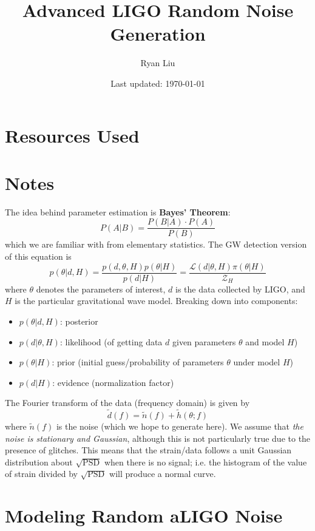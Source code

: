 \documentclass{article}
\title{Advanced LIGO Random Noise Generation}
\author{Ryan Liu}
\date{Last updated: \today}
\newcommand{\lag}{\mathcal{L}}
\begin{document}
\maketitle

\section{Resources Used}



\section{Notes}

The idea behind parameter estimation is \textbf{Bayes' Theorem}:
\begin{equation}
    P (A | B) = \frac{P (B | A) \cdot P (A)}{P(B)}
\end{equation}
which we are familiar with from elementary statistics. The GW detection version of this equation is 
\begin{equation}
    p(\theta | d,H) = \frac{p(d,\theta, H) p(\theta | H)}{p(d|H)} = \frac{\lag(d | \theta, H) \pi(\theta | H)}{\mathcal{Z}_H}
\end{equation}
where $\theta$ denotes the parameters of interest, $d$ is the data collected by LIGO, and $H$ is the particular gravitational wave model. Breaking down into components: 
\begin{itemize}
    \setlength{\itemsep}{0pt}
    \item $p(\theta |d,H)$: posterior 
    \item $p(d|\theta, H)$: likelihood (of getting data $d$ given parameters $\theta$ and model $H$)
    \item $p(\theta | H)$: prior (initial guess/probability of parameters $\theta$ under model $H$)
    \item $p(d | H)$: evidence (normalization factor)
\end{itemize}
The Fourier transform of the data (frequency domain) is given by 
\begin{equation}
    \tilde{d}(f) = \tilde{n}(f) + \tilde{h}(\theta; f)
\end{equation}
where $\tilde{n}(f)$ is the noise (which we hope to generate here). We assume that \textit{the noise is stationary and Gaussian}, although this is not particularly true due to the presence of glitches. This means that the strain/data follows a unit Gaussian distribution about $\sqrt{\text{PSD}}$ when there is no signal; i.e. the histogram of the value of strain divided by $\sqrt{\text{PSD}}$ will produce a normal curve. \\

\section{Modeling Random aLIGO Noise}
\end{document}
